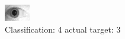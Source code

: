 \begin{figure}[h!]
\begin{center}
\includegraphics[width=0.60\columnwidth]{figures/ID1834_class_4_target_3.png}
\end{center}
\caption{ Classification: 4 actual target: 3}
\label{fig:ID1834_class_4_target_3}
\end{figure}
